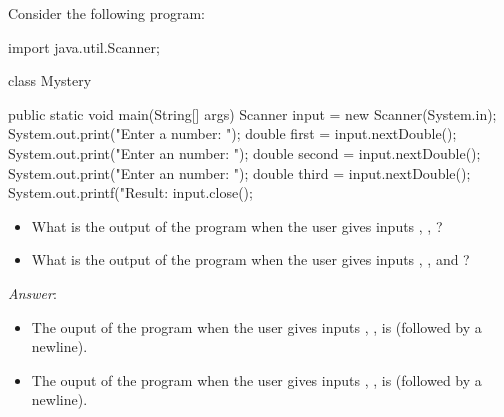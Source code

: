 \begin{example}
Consider the following program:
\begin{code}
import java.util.Scanner;

class Mystery {

  public static void main(String[] args) {
    Scanner input = new Scanner(System.in);
    System.out.print("Enter a number: ");
    double first = input.nextDouble();
    System.out.print("Enter an number: ");
    double second = input.nextDouble();
    System.out.print("Enter an number: ");
    double third = input.nextDouble();
    System.out.printf("Result:%
    input.close();
  }

}
\end{code}
\begin{itemize}
\item
What is the output of the program when the user gives inputs , , ?
\item
What is the output of the program when the user gives inputs , , and ?
\end{itemize}
\noindent \emph{Answer}:
\begin{itemize}
\item
The ouput of the program when the user gives inputs , , 
is  (followed by a newline).
\item
The ouput of the program when the user gives inputs , , 
is  (followed by a newline).
\end{itemize}
\end{example}
%
%
